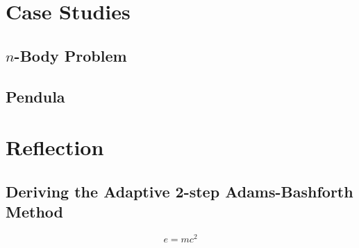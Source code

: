 \documentclass[12pt, twoside]{report}
\theoremstyle{plain}
\theoremstyle{definition}
\theoremstyle{definition}
\begin{document}
        
        
    
\chapter{Case Studies}
\label{5_case_studies}
    \section{$n$-Body Problem}
    \label{5_nbody}

    \section{Pendula}
    \label{pendula}

\chapter{Reflection}
\label{6_reflection}




\clearpage
\section{Deriving the Adaptive 2-step Adams-Bashforth Method}
    \begin{equation}
        e=mc^2
    \end{equation}
\end{document}
